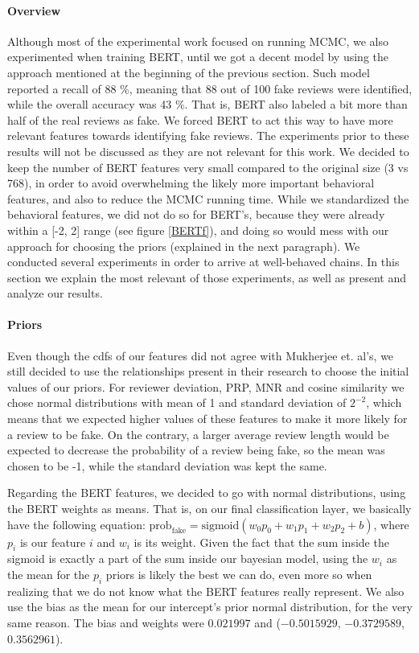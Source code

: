 \documentclass[man, floatsintext, 10pt]{apa6}
\begin{document}
\paragraph{Overview} Although most of the experimental work focused on running MCMC, we also experimented when training BERT, until we got a decent model by using the approach mentioned at the beginning of the previous section. Such model reported a recall of 88 \%, meaning that 88 out of 100 fake reviews were identified, while the overall accuracy was 43 \%. That is, BERT also labeled a bit more than half of the real reviews as fake. We forced BERT to act this way to have more relevant features towards identifying fake reviews. The experiments prior to these results will not be discussed as they are not relevant for this work. We decided to keep the number of BERT features very small compared to the original size (3 vs 768), in order to avoid overwhelming the likely more important behavioral features, and also to reduce the MCMC running time. While we standardized the behavioral features, we did not do so for BERT's, because they were already within a [-2, 2] range (see figure \ref{BERTf}), and doing so would mess with our approach for choosing the priors (explained in the next paragraph). We conducted several experiments in order to arrive at well-behaved chains. In this section we explain the most relevant of those experiments, as well as present and analyze our results. 

\vspace{2mm}

\paragraph{Priors} Even though the cdfs of our features did not agree with Mukherjee et. al's, we still decided to use the relationships present in their research to choose the initial values of our priors. For reviewer deviation, PRP, MNR and cosine similarity we chose normal distributions with mean of 1 and standard deviation of $2^{-2}$, which means that we expected higher values of these features to make it more likely for a review to be fake. On the contrary, a larger average review length would be expected to decrease the probability of a review being fake, so the mean was chosen to be -1, while the standard deviation was kept the same.

Regarding the BERT features, we decided to go with normal distributions, using the BERT weights as means. That is, on our final classification layer, we basically have the following equation: $\text{prob}_{\text{fake}} = \text{sigmoid} (w_0 p_0 + w_1 p_1 + w_2 p_2 + b)$, where $p_i$ is our feature $i$ and $w_i$ is its weight. Given the fact that the sum inside the sigmoid is exactly a part of the sum inside our bayesian model, using the $w_i$ as the mean for the $p_i$ priors is likely the best we can do, even more so when realizing that we do not know what the BERT features really represent. We also use the bias as the mean for our intercept's prior normal distribution, for the very same reason. The bias and weights were $0.021997$ and ($-0.5015929$, $-0.3729589$, $0.3562961$). 
\end{document}
